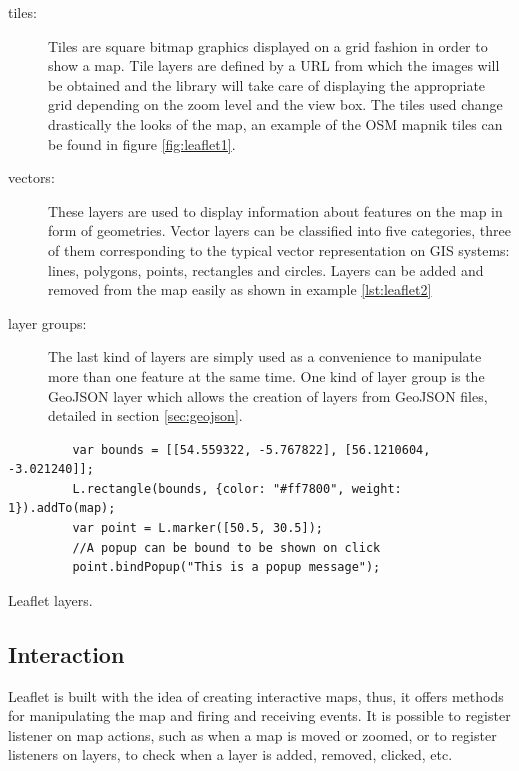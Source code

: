 \begin{description}
\item[tiles:] Tiles are square bitmap graphics displayed on a grid fashion in order to show a map. Tile layers are defined by a URL from which the images will be obtained and the library will take care of displaying the appropriate grid depending on the zoom level and the view box. The tiles used change drastically the looks of the map, an example of the OSM mapnik tiles can be found in figure \ref{fig:leaflet1}.

\item[vectors:] These layers are used to display information about features on the map in form of geometries. Vector layers can be classified into five categories, three of them corresponding to the typical vector representation on GIS systems: lines, polygons, points, rectangles and circles. Layers can be added and removed from the map easily as shown in example \ref{lst:leaflet2}

\item[layer groups:] The last kind of layers are simply used as a convenience to manipulate more than one feature at the same time. One kind of layer group is the GeoJSON layer which allows the creation of layers from GeoJSON files, detailed in section \ref{sec:geojson}.

\end{description}

\begin{listing}[ht]\centering
  \begin{minipage}{.7\textwidth}
    \begin{verbatim}
	     var bounds = [[54.559322, -5.767822], [56.1210604, -3.021240]];
	     L.rectangle(bounds, {color: "#ff7800", weight: 1}).addTo(map);
	     var point = L.marker([50.5, 30.5]);
	     //A popup can be bound to be shown on click
	     point.bindPopup("This is a popup message");
    \end{verbatim}
  \end{minipage}
  \caption{Leaflet layers.}\label{lst:leaflet2}
\end{listing}

\subsection*{Interaction}

Leaflet is built with the idea of creating interactive maps, thus, it offers methods for manipulating the map and firing and receiving events. It is possible to register listener on map actions, such as when a map is moved or zoomed, or to register listeners on layers, to check when a layer is added, removed, clicked, etc.

